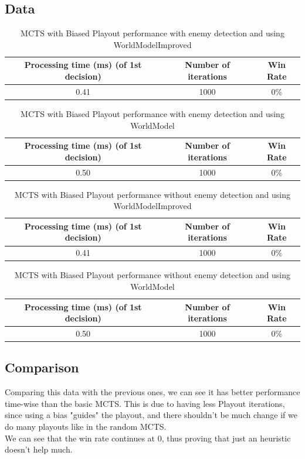 \documentclass{article}
\begin{document}
  \subsection{Data}
  \begin{table}[h!]
    \centering
    \caption{MCTS with Biased Playout performance with enemy detection and using WorldModelImproved}
    \label{tab:tableBiasedMCTS1}
    \begin{tabular}{c|c|c}
      \textbf{Processing time (ms) (of 1st decision)} & \textbf{Number of iterations} & \textbf{Win Rate}\\
      \hline
      0.41 & 1000 & 0\%
    \end{tabular}
  \end{table}
  \begin{table}[h!]
    \centering
    \caption{MCTS with Biased Playout performance with enemy detection and using WorldModel}
    \label{tab:tableBiasedMCTS2}
    \begin{tabular}{c|c|c}
      \textbf{Processing time (ms) (of 1st decision)} & \textbf{Number of iterations} & \textbf{Win Rate}\\
      \hline
      0.50 & 1000 & 0\%
    \end{tabular}
  \end{table}
  \begin{table}[h!]
    \centering
    \caption{MCTS with Biased Playout performance without enemy detection and using WorldModelImproved}
    \label{tab:tableBiasedMCTS3}
    \begin{tabular}{c|c|c}
      \textbf{Processing time (ms) (of 1st decision)} & \textbf{Number of iterations} & \textbf{Win Rate}\\
      \hline
      0.41 & 1000 & 0\%
    \end{tabular}
  \end{table}
  \begin{table}[h!]
    \centering
    \caption{MCTS with Biased Playout performance without enemy detection and using WorldModel}
    \label{tab:tableBiasedMCTS4}
    \begin{tabular}{c|c|c}
      \textbf{Processing time (ms) (of 1st decision)} & \textbf{Number of iterations} & \textbf{Win Rate}\\
      \hline
      0.50 & 1000 & 0\%
    \end{tabular}
  \end{table}

  \subsection{Comparison}
  Comparing this data with the previous ones, we can see it has better performance time-wise than the basic MCTS. This is due to having less Playout iterations,
  since using a bias "guides" the playout, and there shouldn't be much change if we do many playouts like in the random MCTS.\\
  We can see that the win rate continues at 0, thus proving that just an heuristic doesn't help much. 
\end{document}
